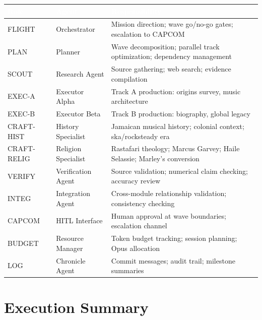 \documentclass[11pt,letterpaper]{article}
\newcommand{\tableheader}[1]{\textbf{\sffamily\textcolor{white}{#1}}}
\begin{document}
\begin{center}
\begin{tabularx}{\textwidth}{L{2cm}L{3cm}X}
\toprule
{}
\tableheader{Role} & \tableheader{Agent} & \tableheader{Responsibility} \\
\midrule
FLIGHT & Orchestrator & Mission direction; wave go/no-go gates; escalation to CAPCOM \\
PLAN & Planner & Wave decomposition; parallel track optimization; dependency management \\
SCOUT & Research Agent & Source gathering; web search; evidence compilation \\
EXEC-A & Executor Alpha & Track A production: origins survey, music architecture \\
EXEC-B & Executor Beta & Track B production: biography, global legacy \\
CRAFT-HIST & History Specialist & Jamaican musical history; colonial context; ska/rocksteady era \\
CRAFT-RELIG & Religion Specialist & Rastafari theology; Marcus Garvey; Haile Selassie; Marley's conversion \\
VERIFY & Verification Agent & Source validation; numerical claim checking; accuracy review \\
INTEG & Integration Agent & Cross-module relationship validation; consistency checking \\
CAPCOM & HITL Interface & Human approval at wave boundaries; escalation channel \\
BUDGET & Resource Manager & Token budget tracking; session planning; Opus allocation \\
LOG & Chronicle Agent & Commit messages; audit trail; milestone summaries \\
\bottomrule
\end{tabularx}
\end{center}

\section{Execution Summary}
\end{document}
